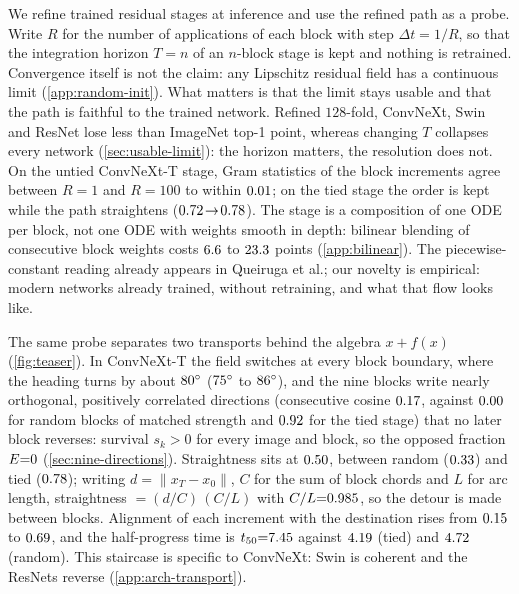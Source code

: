 We refine trained residual stages at inference and use the refined path as a probe.
Write $R$ for the number of applications of each block with step $\Delta t{=}1/R$, so
that the integration horizon $T{=}n$ of an $n$-block stage is kept and nothing is
retrained.
Convergence itself is not the claim: any Lipschitz residual field has a continuous
limit (\cref{app:random-init}).
What matters is that the limit stays usable and that the path is faithful to the
trained network.
Refined $128$-fold, ConvNeXt, Swin and ResNet lose less than 
ImageNet top-1 point, whereas changing $T$ collapses every network
(\cref{sec:usable-limit}): the horizon matters, the resolution does not.
On the untied ConvNeXt-T stage, Gram statistics of the block increments agree between
$R{=}1$ and $R{=}100$ to within $0.01$; on the tied stage the order is
kept while the path straightens ($0.72\!\to\!0.78$).
The stage is a composition of one ODE per block, not one ODE with weights smooth in
depth: bilinear blending of consecutive block weights costs $6.6$ to
$23.3$ points (\cref{app:bilinear}).
The piecewise-constant reading already appears in Queiruga et al.; our novelty is
empirical: modern networks already trained, without retraining, and what that flow
looks like.

The same probe separates two transports behind the algebra $x+f(x)$
(\cref{fig:teaser}).
In ConvNeXt-T the field switches at every block boundary, where the heading turns by
about $80^\circ$ ($75^\circ$ to $86^\circ$), and the nine blocks write
nearly orthogonal, positively correlated directions (consecutive cosine $0.17$,
against $0.00$ for random blocks of matched strength and $0.92$ for the
tied stage) that no later block reverses: survival $s_k>0$ for every image and block,
so the opposed fraction $E{=}0$ (\cref{sec:nine-directions}).
Straightness sits at $0.50$, between random ($0.33$) and tied
($0.78$); writing $d=\|x_T-x_0\|$, $C$ for the sum of block chords and $L$ for
arc length, straightness $= (d/C)\,(C/L)$ with $C/L{=}0.985$, so the
detour is made between blocks.
Alignment of each increment with the destination rises from $0.15$ to
$0.69$, and the half-progress time is $t_{50}{=}7.45$ against
$4.19$ (tied) and $4.72$ (random).
This staircase is specific to ConvNeXt: Swin is coherent and the ResNets reverse
(\cref{app:arch-transport}).

